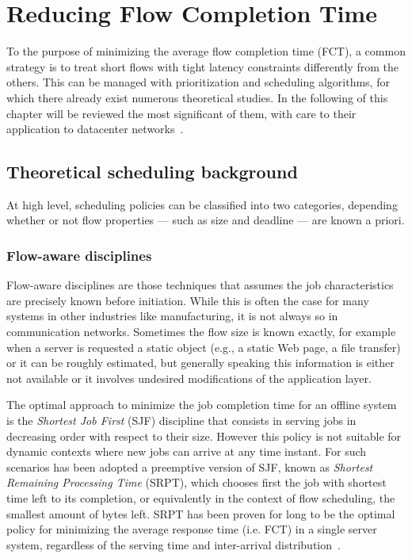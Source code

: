 \chapter{Reducing Flow Completion Time}
\label{ch:theoretical-scheduling-bg}
To the purpose of minimizing the average flow completion time (FCT), a common strategy is to treat short flows with tight latency constraints differently from the others. This can be managed with prioritization and scheduling algorithms, for which there already exist numerous theoretical studies. In the following of this chapter will be reviewed the most significant of them, with care to their application to datacenter networks~\cite{dpp, 188942, pFabric, pias, one-more-queue, pdq}. 

\section{Theoretical scheduling background}
At high level, scheduling policies can be classified into two categories, depending whether or not flow properties --- such as size and deadline --- are known a priori.

\subsection{Flow-aware disciplines}
Flow-aware disciplines are those techniques that assumes the job characteristics are precisely known before initiation. While this is often the case for many systems in other industries like manufacturing, it is not always so in communication networks. Sometimes the flow size is known exactly, for example when a server is requested a static object (e.g., a static Web page, a file transfer) or it can be roughly estimated, but generally speaking this information is either not available or it involves undesired modifications of the application layer.

The optimal approach to minimize the job completion time for an offline system is the \emph{Shortest Job First} (SJF) discipline that consists in serving jobs in decreasing order with respect to their size. However this policy is not suitable for dynamic contexts where new jobs can arrive at any time instant. For such scenarios has been adopted a preemptive version of SJF, known as \emph{Shortest Remaining Processing Time} (SRPT), which chooses first the job with shortest time left to its completion, or equivalently in the context of flow scheduling, the smallest amount of bytes left. SRPT has been proven for long to be the optimal policy for minimizing the average response time (i.e. FCT) in a single server system, regardless of the serving time and inter-arrival distribution~\cite{schrage_1968}. 

